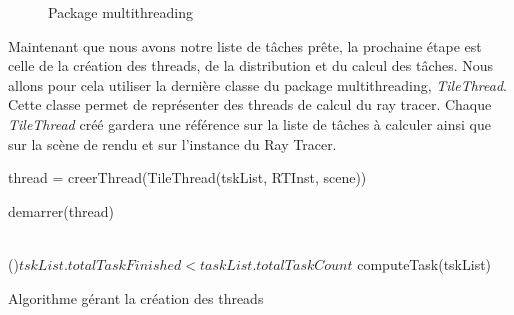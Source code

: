 \documentclass[11pt]{article}
\begin{document}
\begin{figure}[h!]

	\caption{Package multithreading}
	\label{packageMultithreading}
\end{figure}
\FloatBarrier

Maintenant que nous avons notre liste de tâches prête, la prochaine étape est celle de la création des threads, de la distribution et du calcul des tâches. Nous allons pour cela utiliser la dernière classe du package multithreading, \textit{TileThread}. Cette classe permet de représenter des threads de calcul du ray tracer. Chaque \textit{TileThread} créé gardera une référence sur la liste de tâches à calculer ainsi que sur la scène de rendu et sur l'instance du Ray Tracer.

\begin{algorithm}[H]
	
	{
		thread = creerThread(TileThread(tskList, RTInst, scene))

		demarrer(thread)
	}\hfill\\

	\While(){$tskList.totalTaskFinished < taskList.totalTaskCount$}
	{
		computeTask(tskList)
	}

	\caption{Algorithme gérant la création des threads}
	\label{creationThreads}
\end{algorithm}
\end{document}

